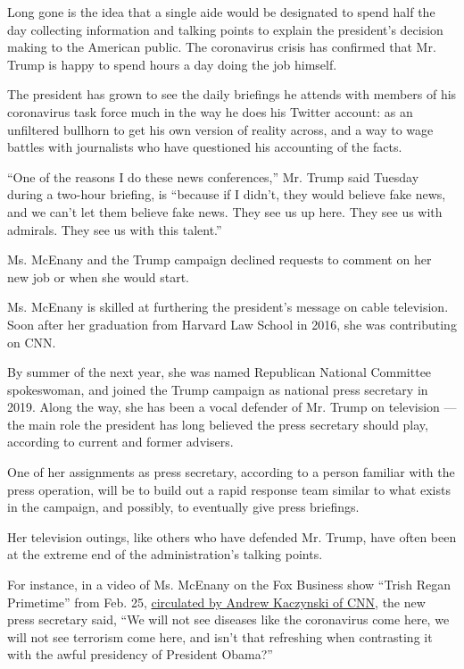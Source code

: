 Long gone is the idea that a single aide would be designated to spend
half the day collecting information and talking points to explain the
president's decision making to the American public. The coronavirus
crisis has confirmed that Mr. Trump is happy to spend hours a day doing
the job himself.

The president has grown to see the daily briefings he attends with
members of his coronavirus task force much in the way he does his
Twitter account: as an unfiltered bullhorn to get his own version of
reality across, and a way to wage battles with journalists who have
questioned his accounting of the facts.

``One of the reasons I do these news conferences,'' Mr. Trump said
Tuesday during a two-hour briefing, is ``because if I didn't, they would
believe fake news, and we can't let them believe fake news. They see us
up here. They see us with admirals. They see us with this talent.''

Ms. McEnany and the Trump campaign declined requests to comment on her
new job or when she would start.

Ms. McEnany is skilled at furthering the president's message on cable
television. Soon after her graduation from Harvard Law School in 2016,
she was contributing on CNN.

By summer of the next year, she was named Republican National Committee
spokeswoman, and joined the Trump campaign as national press secretary
in 2019. Along the way, she has been a vocal defender of Mr. Trump on
television --- the main role the president has long believed the press
secretary should play, according to current and former advisers.

One of her assignments as press secretary, according to a person
familiar with the press operation, will be to build out a rapid response
team similar to what exists in the campaign, and possibly, to eventually
give press briefings.

Her television outings, like others who have defended Mr. Trump, have
often been at the extreme end of the administration's talking points.

For instance, in a video of Ms. McEnany on the Fox Business show ``Trish
Regan Primetime'' from Feb. 25,
\href{https://twitter.com/KFILE/status/1246454626905468931}{circulated
by Andrew Kaczynski of CNN}, the new press secretary said, ``We will not
see diseases like the coronavirus come here, we will not see terrorism
come here, and isn't that refreshing when contrasting it with the awful
presidency of President Obama?''

